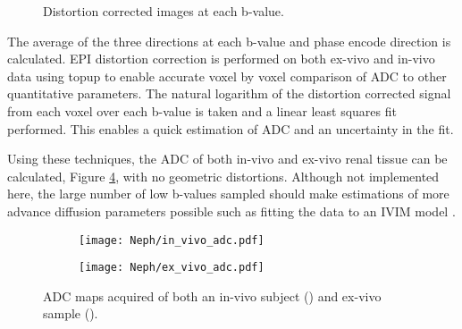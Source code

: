 \begin{figure}[H]
	\centering
	\caption{Distortion corrected images at each b-value.}
	\label{fig:ex_adc_raw_data}	
\end{figure}
%
%

The average of the three directions at each b-value and phase encode direction is calculated. \ac{EPI} distortion correction is performed on both ex-vivo and in-vivo data using topup to enable accurate voxel by voxel comparison of \ac{ADC} to other quantitative parameters. The natural logarithm of the distortion corrected signal from each voxel over each b-value is taken and a linear least squares fit performed. This enables a quick estimation of \ac{ADC} and an uncertainty in the fit. 

Using these techniques, the \ac{ADC} of both in-vivo and ex-vivo renal tissue can be calculated, Figure \ref{fig:ex_adc_maps}, with no geometric distortions. Although not implemented here, the large number of low b-values sampled should make estimations of more advance diffusion parameters possible such as fitting the data to an \ac{IVIM} model \cite{le_bihan_separation_1988}.

\begin{figure}[H]
	\centering
	\begin{subfigure}[c]{0.47\textwidth}
		\centering
		\texttt{[image: Neph/in\_vivo\_adc.pdf]}%
		\caption{}
		\label{fig:ex_adc_maps_in_vivo}
	\end{subfigure}
	\hfill
	\begin{subfigure}[c]{0.47\textwidth}
		\centering
		\texttt{[image: Neph/ex\_vivo\_adc.pdf]}%
		\caption{}
		\label{fig:ex_adc_maps_ex_vivo}
	\end{subfigure}
	\caption{\ac{ADC} maps acquired of both an in-vivo subject () and ex-vivo sample ().}
	\label{fig:ex_adc_maps}
\end{figure}




